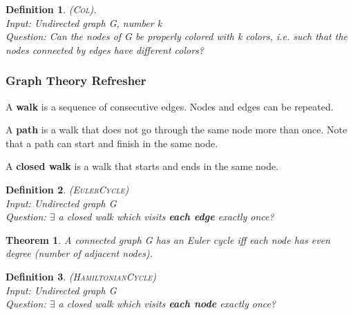 \documentclass[a3paper, 8pt]{extarticle}
\newtheorem*{theorem*}{Theorem}
\newtheorem*{definition}{Definition}
\begin{document}
\begin{multicols*}{6}

\begin{definition}
    \textsc{(Col)}. \\
    Input: Undirected graph G, number k\\
    Question: Can the nodes of G be properly colored with k colors, i.e. such that the nodes connected by edges have different colors?
\end{definition}
\subsubsection{Graph Theory Refresher}

    A \textbf{walk} is a sequence of consecutive edges. Nodes and edges can be repeated.

A \textbf{path} is a walk that does not go through  the same node more than once. Note that a path can start and finish in the same node.

    A \textbf{closed walk} is a  walk that starts and ends in the same node.

    

\begin{definition}
\textsc{(EulerCycle)}\\
Input: Undirected graph G\\
Question: $\exists$ a closed walk which visits \textbf{each edge} exactly once?
\end{definition}

\begin{theorem*}
    A connected graph G has an Euler cycle iff each node has even degree (number of adjacent nodes).
\end{theorem*}

\begin{definition}
\textsc{(HamiltonianCycle)}\\
Input: Undirected graph G\\
Question: $\exists$ a closed walk which visits \textbf{each node} exactly once?
\end{definition}


\end{multicols*}
\end{document}
